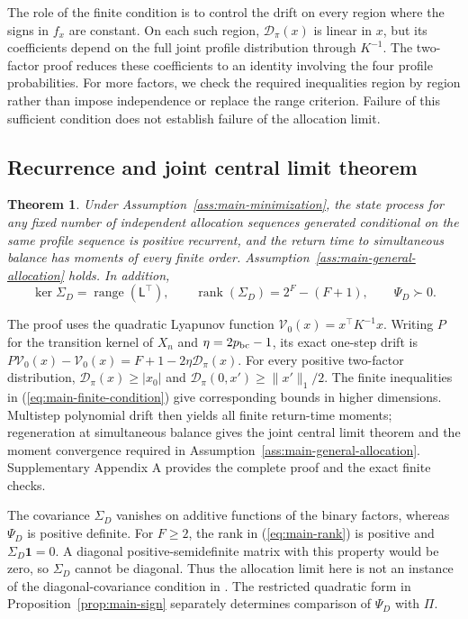 \documentclass[12pt,a4paper]{article}
\newtheorem{theorem}{Theorem}
\theoremstyle{definition}
\begin{document}
The role of the finite condition is to control the drift on every region where the signs in $f_x$ are constant. On each such region, $\mathcal D_\pi(x)$ is linear in $x$, but its coefficients depend on the full joint profile distribution through $K^{-1}$. The two-factor proof reduces these coefficients to an identity involving the four profile probabilities. For more factors, we check the required inequalities region by region rather than impose independence or replace the range criterion. Failure of this sufficient condition does not establish failure of the allocation limit.

\subsection{Recurrence and joint central limit theorem}
\begin{theorem}\label{thm:main-allocation}
Under Assumption~\ref{ass:main-minimization}, the state process for any fixed number of independent allocation sequences generated conditional on the same profile sequence is positive recurrent, and the return time to simultaneous balance has moments of every finite order. Assumption~\ref{ass:main-general-allocation} holds. In addition,
\begin{equation}\label{eq:main-rank}
 \ker\Sigma_D=\operatorname{range}(\mathsf L^\top),\qquad
 \operatorname{rank}(\Sigma_D)=2^F-(F+1),\qquad \Psi_D\succ0.
\end{equation}
\end{theorem}

The proof uses the quadratic Lyapunov function $\mathcal V_0(x)=x^\top K^{-1}x$. Writing $P$ for the transition kernel of $X_n$ and $\eta=2p_{\rm bc}-1$, its exact one-step drift is $P\mathcal V_0(x)-\mathcal V_0(x)=F+1-2\eta \mathcal D_\pi(x)$. For every positive two-factor distribution, $\mathcal D_\pi(x)\ge|x_0|$ and $\mathcal D_\pi(0,x')\ge\|x'\|_1/2$. The finite inequalities in (\ref{eq:main-finite-condition}) give corresponding bounds in higher dimensions. Multistep polynomial drift then yields all finite return-time moments; regeneration at simultaneous balance gives the joint central limit theorem and the moment convergence required in Assumption~\ref{ass:main-general-allocation}. Supplementary Appendix A provides the complete proof and the exact finite checks.

The covariance $\Sigma_D$ vanishes on additive functions of the binary factors, whereas $\Psi_D$ is positive definite. For $F\ge2$, the rank in (\ref{eq:main-rank}) is positive and $\Sigma_D\bm1=0$. A diagonal positive-semidefinite matrix with this property would be zero, so $\Sigma_D$ cannot be diagonal. Thus the allocation limit here is not an instance of the diagonal-covariance condition in \citet[Assumption~2.2]{BugniCanayShaikh2018}. The restricted quadratic form in Proposition~\ref{prop:main-sign} separately determines comparison of $\Psi_D$ with $\Pi$.
\end{document}
